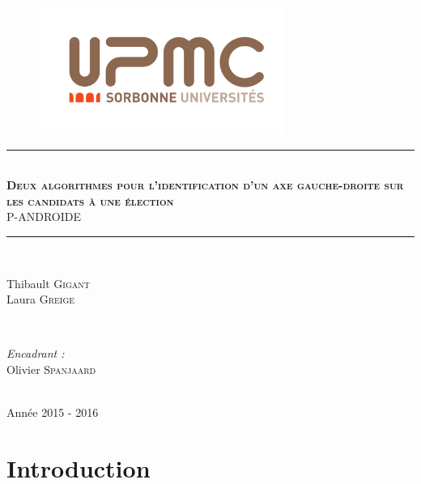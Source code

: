 \documentclass[11pt, a4paper]{article}
\newcommand{\hmark}{\rule{\linewidth}{0.5mm}}
\begin{document}
\begin{titlepage}

\centering

\begin{figure}[t]
\begin{center}
\includegraphics[width=8cm]{Images/upmc.png}
\end{center}
\end{figure}

\hmark \\[0.5cm]
\textsc{\textbf{\Large Deux algorithmes pour l'identification d'un axe gauche-droite sur les candidats à une élection}} \\[0.5cm]
\textsc{P-ANDROIDE} \\[0.5cm]
\hmark \\[5cm]

\begin{minipage}{0.4\textwidth}
\begin{flushleft}
Thibault \textsc{Gigant}\\
Laura \textsc{Greige}
\end{flushleft}
\end{minipage}
~
\begin{minipage}{0.4\textwidth}
\begin{flushright} \large
\emph{Encadrant :}\\
Olivier \textsc{Spanjaard}
\end{flushright}
\end{minipage}\\[4cm]

\large Année 2015 - 2016

\end{titlepage}
\newpage

\tableofcontents

\newpage


\pagestyle{fancy}
\renewcommand{\headrulewidth}{1pt}

\section*{Introduction}
\end{document}
